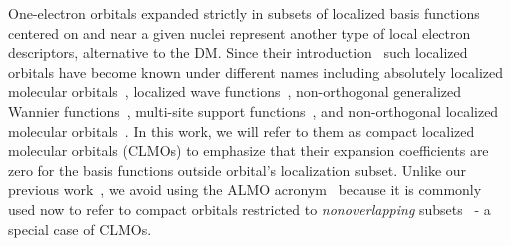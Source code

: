 \documentclass[aps,prl,twocolumn,reprint,amsmath,amssymb]{revtex4-1}
\begin{document}
One-electron orbitals expanded strictly in subsets of localized basis functions centered on and near a given nuclei 
represent another type of local electron descriptors, alternative to the DM. 
Since their introduction~\cite{matsuoka1977expansion, stoll1977on, mehler1977self} such localized orbitals have become known under different names including absolutely localized molecular orbitals~\cite{stoll1980use}, localized wave functions~\cite{ordejon1995linear}, non-orthogonal generalized Wannier functions~\cite{skylaris2005introducing}, multi-site support functions~\cite{nakata2015optimized}, and non-orthogonal localized molecular orbitals~\cite{burger2008linear}. 
In this work, we will refer to them as compact localized molecular orbitals (CLMOs) to emphasize that their expansion coefficients are zero for the basis functions outside orbital's localization subset. Unlike our previous work~\cite{khaliullin2013efficient}, we avoid using the ALMO acronym~\cite{stoll1980use} because it is commonly used now to refer to compact orbitals restricted to \emph{nonoverlapping} subsets~\cite{khaliullin2006efficient, khaliullin2007unravelling, khaliullin2008analysis, horn2013unrestricted} - a special case of CLMOs. 

\end{document}
